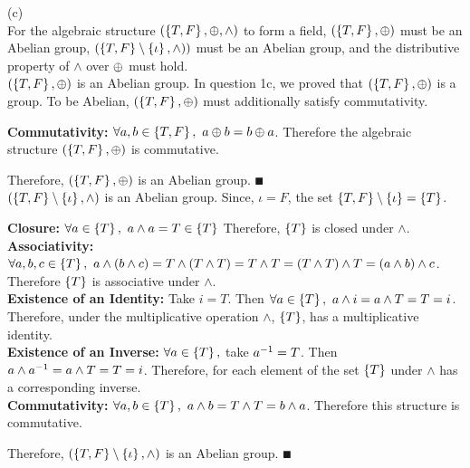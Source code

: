 \documentclass[a4paper, 11pt]{report}
\begin{document}
\sol (c) \\
For the algebraic structure $(\left\lbrace T,F \right\rbrace,\oplus,\land)$ to form a field, $(\left\lbrace T,F \right\rbrace,\oplus)$ must be an Abelian group, $(\left\lbrace T,F \right\rbrace\setminus\left\lbrace \iota \right\rbrace,\land))$ must be an Abelian group, and the distributive property of $\land$ over $\oplus$ must hold. \\ 

\Lemma $(\left\lbrace T,F \right\rbrace,\oplus)$ is an Abelian group. 
\proof In question 1c, we proved that $(\left\lbrace T,F \right\rbrace,\oplus)$ is a group. To be Abelian, $(\left\lbrace T,F \right\rbrace, \oplus)$ must additionally satisfy commutativity. \\
\begin{list}{}{\setlength{\leftmargin}{0.5in}\setlength{\topsep}{0pt}}\item 
  \textbf{Commutativity:} $\forall a,b\in\left\lbrace T,F \right\rbrace,\ a\oplus b = b\oplus a$. Therefore the algebraic structure $(\left\lbrace T,F \right\rbrace, \oplus)$ is commutative. \\
\end{list}
Therefore, $(\left\lbrace T,F \right\rbrace,\oplus)$ is an Abelian group. $\QED$ \\

\Lemma $(\left\lbrace T,F \right\rbrace\setminus\left\lbrace \iota \right\rbrace, \land)$ is an Abelian group.
\proof Since, $\iota=F$, the set $\left\lbrace T,F \right\rbrace\setminus\left\lbrace \iota \right\rbrace=\left\lbrace T \right\rbrace$. \\
\begin{list}{}{\setlength{\leftmargin}{0.5in}\setlength{\topsep}{0pt}}\item 
  \textbf{Closure:} $\forall a\in\left\lbrace T \right\rbrace,\ a\land a = T\in\left\lbrace T \right\rbrace$ Therefore, $\left\lbrace T \right\rbrace$ is closed under $\land$. \\
  \textbf{Associativity:} $\forall a,b,c\in\left\lbrace T \right\rbrace,\ a\land (b\land c)= T\land (T\land T) = T\land T = (T\land T) \land T = (a\land b)\land c$. Therefore $\left\lbrace T \right\rbrace$ is associative under $\land$. \\
  \textbf{Existence of an Identity:} Take $i=T$. Then $\forall a\in\left\lbrace T \right\rbrace,\ a\land i = a\land T = T = i$. Therefore, under the multiplicative operation $\land$, $\left\lbrace T \right\rbrace$, has a multiplicative identity. \\
  \textbf{Existence of an Inverse:} $\forall a\in\left\lbrace T \right\rbrace,$ take $a^{-1}=T$. Then $a\land a^{-1} = a\land T = T = i$. Therefore, for each element of the set $\left\lbrace T \right\rbrace$ under $\land$ has a corresponding inverse. \\
  \textbf{Commutativity:} $\forall a,b\in\left\lbrace T \right\rbrace,\ a\land b = T\land T = b\land a$. Therefore this structure is commutative. \\
\end{list}
Therefore, $(\left\lbrace T,F \right\rbrace\setminus\left\lbrace \iota \right\rbrace,\land)$ is an Abelian group. $\QED$ \\
\end{document}
